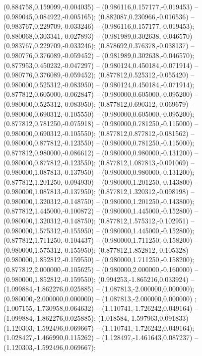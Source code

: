  (0.884758,0.159099,-0.004035) -- (0.986116,0.157177,-0.019453) -- (0.989045,0.084922,-0.005165);
 (0.882087,0.230966,-0.016536) -- (0.983767,0.229709,-0.033246) -- (0.986116,0.157177,-0.019453);
 (0.880068,0.303341,-0.027893) -- (0.981989,0.302638,-0.046570) -- (0.983767,0.229709,-0.033246);
 (0.878692,0.376378,-0.038137) -- (0.980776,0.376089,-0.059452) -- (0.981989,0.302638,-0.046570);
 (0.877953,0.450232,-0.047297) -- (0.980124,0.450184,-0.071914) -- (0.980776,0.376089,-0.059452);
 (0.877812,0.525312,-0.055420) -- (0.980000,0.525312,-0.083950) -- (0.980124,0.450184,-0.071914);
 (0.877812,0.605000,-0.062847) -- (0.980000,0.605000,-0.095200) -- (0.980000,0.525312,-0.083950);
 (0.877812,0.690312,-0.069679) -- (0.980000,0.690312,-0.105550) -- (0.980000,0.605000,-0.095200);
 (0.877812,0.781250,-0.075918) -- (0.980000,0.781250,-0.115000) -- (0.980000,0.690312,-0.105550);
 (0.877812,0.877812,-0.081562) -- (0.980000,0.877812,-0.123550) -- (0.980000,0.781250,-0.115000);
 (0.877812,0.980000,-0.086612) -- (0.980000,0.980000,-0.131200) -- (0.980000,0.877812,-0.123550);
 (0.877812,1.087813,-0.091069) -- (0.980000,1.087813,-0.137950) -- (0.980000,0.980000,-0.131200);
 (0.877812,1.201250,-0.094930) -- (0.980000,1.201250,-0.143800) -- (0.980000,1.087813,-0.137950);
 (0.877812,1.320312,-0.098198) -- (0.980000,1.320312,-0.148750) -- (0.980000,1.201250,-0.143800);
 (0.877812,1.445000,-0.100872) -- (0.980000,1.445000,-0.152800) -- (0.980000,1.320312,-0.148750);
 (0.877812,1.575312,-0.102951) -- (0.980000,1.575312,-0.155950) -- (0.980000,1.445000,-0.152800);
 (0.877812,1.711250,-0.104437) -- (0.980000,1.711250,-0.158200) -- (0.980000,1.575312,-0.155950);
 (0.877812,1.852812,-0.105328) -- (0.980000,1.852812,-0.159550) -- (0.980000,1.711250,-0.158200);
 (0.877812,2.000000,-0.105625) -- (0.980000,2.000000,-0.160000) -- (0.980000,1.852812,-0.159550);
 (0.994253,-1.865216,0.033924) -- (1.099884,-1.862276,0.025885) -- (1.087813,-2.000000,0.000000);
 (0.980000,-2.000000,0.000000) -- (1.087813,-2.000000,0.000000) ;
 (1.007155,-1.730958,0.064632) -- (1.110741,-1.726242,0.049164) -- (1.099884,-1.862276,0.025885);
 (1.018584,-1.597963,0.091833) -- (1.120303,-1.592496,0.069667) -- (1.110741,-1.726242,0.049164);
 (1.028427,-1.466990,0.115262) -- (1.128497,-1.461643,0.087237) -- (1.120303,-1.592496,0.069667);
